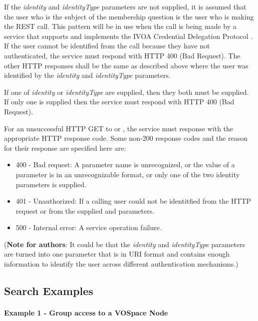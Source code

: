 \documentclass[11pt,a4paper]{ivoa}
\begin{document}
If the \emph{identity} and \emph{identityType} parameters are not supplied, it is assumed that the user who is the subject of the membership question is the user who is making the REST call.  This pattern will be in use when the call is being made by a service that supports and implements the IVOA Credential Delegation Protocol \citep{2010ivoa.spec.0218P}.  If the user cannot be identified from the call because they have not authenticated, the service must respond with HTTP 400 (Bad Request).  The other HTTP responses shall be the same as described above where the user was identified by the \emph{identity} and \emph{identityType} parameters.

If one of \emph{identity} or \emph{identityType} are supplied, then they both must be supplied.  If only one is supplied then the service must respond with HTTP 400 (Bad Request).

For an unsuccessful HTTP GET to  or , the service must response with the appropriate HTTP response code.  Some non-200 response codes and the reason for their response are specified here are:

\begin{itemize}
\item{400} - Bad request:  A parameter name is unrecognized, or the value of a parameter is in an unrecognizable format, or only one of the two identity parameters is supplied.
\item{401} - Unauthorized:  If a calling user could not be identitfied from the HTTP request or from the supplied  and  parameters.
\item{500} - Internal error:  A service operation failure.
\end{itemize}

(\textbf{Note for authors}: It could be that the \emph{identity} and \emph{identityType} parameters are turned into one parameter that is in URI format and contains enough information to identify the user across different authentication mechanisms.)

\subsection {Search Examples}

\paragraph{Example 1 - Group access to a VOSpace Node}
\end{document}
